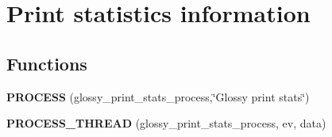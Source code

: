\hypertarget{group__glossy-test-print-stats}{
\section{Print statistics information}
\label{group__glossy-test-print-stats}
}
\subsection*{Functions}
\begin{DoxyCompactItemize}
\item 
\hypertarget{group__glossy-test-print-stats_ga10726d2aa7b149ad5485888bba70177c}{
{\bfseries PROCESS} (glossy\_\-print\_\-stats\_\-process,\char`\"{}Glossy print stats\char`\"{})}
\label{group__glossy-test-print-stats_ga10726d2aa7b149ad5485888bba70177c}

\item 
\hypertarget{group__glossy-test-print-stats_gad8f76fdcda797bef20444c5e4ee181c5}{
{\bfseries PROCESS\_\-THREAD} (glossy\_\-print\_\-stats\_\-process, ev, data)}
\label{group__glossy-test-print-stats_gad8f76fdcda797bef20444c5e4ee181c5}

\end{DoxyCompactItemize}

